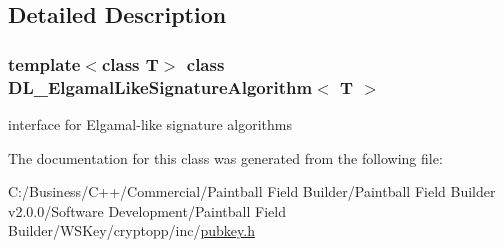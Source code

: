 \subsection{Detailed Description}
\subsubsection*{template$<$class T$>$ class DL\_\-ElgamalLikeSignatureAlgorithm$<$ T $>$}

interface for Elgamal-\/like signature algorithms 

The documentation for this class was generated from the following file:\begin{DoxyCompactItemize}
\item 
C:/Business/C++/Commercial/Paintball Field Builder/Paintball Field Builder v2.0.0/Software Development/Paintball Field Builder/WSKey/cryptopp/inc/\hyperlink{pubkey_8h}{pubkey.h}\end{DoxyCompactItemize}
